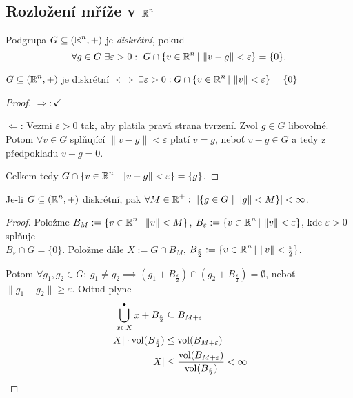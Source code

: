 \subsection{\texorpdfstring{Rozložení mříže v $\operatorname{\mathbb{R}}^n$}{Rozlození mrize v R\^\ n}}

\begin{definition}
Podgrupa $G\subseteq(\operatorname{\mathbb{R}}^n,+)$ je \emph{diskrétní}, pokud $$\forall g\in G\ \exists \varepsilon>0 : \ G\cap\{v\in\Real^n|\ \|v-g\|<\varepsilon\}=\{0\}\text{.}$$
\end{definition}
\begin{observation}
$G\subseteq(\operatorname{\mathbb{R}}^n,+)$ je diskrétní $\iff \exists\varepsilon>0:
G\cap\{v\in\operatorname{\mathbb{R}}^n| \ \|v\|<\varepsilon\}=\{0\}$
\end{observation}
\begin{proof}
$\Rightarrow: \checkmark$

$\Leftarrow$: Vezmi $\varepsilon>0$ tak, aby platila pravá strana tvrzení. Zvol $g \in G$ libovolné. Potom $\forall v\in G$ splňující $\|v-g\|<\varepsilon$ platí $v=g$, neboť $v-g\in G$ a tedy z předpokladu $v-g=0$.

Celkem tedy $G\cap \{v\in\Real^n| \ \|v-g\|<\varepsilon\}=\{g\}$.
\end{proof}

\begin{consequence}
Je-li $G\subseteq (\operatorname{\mathbb{R}}^n,+)$ diskrétní, pak $\forall M\in\operatorname{\mathbb{R}}^+:\ |\{g\in G \ | \ \|g\|<M\}|<\infty$.
\end{consequence}
\begin{proof}
Položme $B_M:=\{v\in\operatorname{\mathbb{R}}^n| \ \|v\|<M\}$, $B_\varepsilon:=\{v\in\Real^n| \ \|v\|<\varepsilon\}$, kde $\varepsilon>0$ splňuje \\ $B_\varepsilon\cap G=\{0\}$.
Položme dále $X:=G\cap B_M$, $B_{\frac{\varepsilon}{2}}:=\{v\in\Real^n| \ \|v\|<\frac{\varepsilon}{2}\}$. 

Potom $\forall g_1, g_2\in G: \ g_1\neq g_2\implies(g_1+B_{\frac{\varepsilon}{2}})\cap(g_2+B_{\frac{\varepsilon}{2}})=\emptyset $, neboť $\|g_1-g_2\|\geq \varepsilon$. Odtud plyne
\begin{align*}
    \operatorname*{\overset{\bullet}{\bigcup}}_{x\in X} x+B_{\frac{\varepsilon}{2}}&\subseteq B_{M+\varepsilon}\\
    |X|\cdot \operatorname{vol}(B_{\frac{\varepsilon}{2}})&\leq \operatorname{vol}(B_{M+\varepsilon})\\
    |X|&\leq \frac{\operatorname{vol}(B_{M+\varepsilon})}{\operatorname{vol}(B_{\frac{\varepsilon}{2}})}<\infty\\
\end{align*}
\end{proof}

